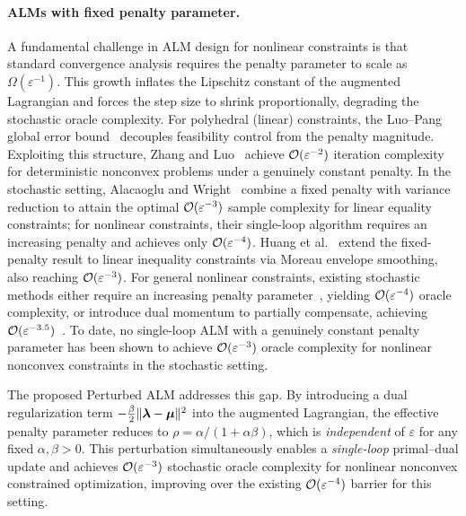 \documentclass[10pt]{article}
\begin{document}
\paragraph{ALMs with fixed penalty parameter.}
A fundamental challenge in ALM design for nonlinear constraints is that
standard convergence analysis requires the penalty parameter to scale as
$\Omega(\varepsilon^{-1})$.
This growth inflates the Lipschitz constant of the augmented Lagrangian and
forces the step size to shrink proportionally, degrading the stochastic oracle
complexity.
For polyhedral (linear) constraints, the Luo--Pang global error
bound~\cite{luo1994error} decouples feasibility control from the penalty
magnitude.
Exploiting this structure, Zhang and Luo~\cite{zhang2022proximal} achieve
$\mathcal{O}(\varepsilon^{-2})$ iteration complexity for deterministic nonconvex
problems under a genuinely constant penalty.
In the stochastic setting, Alacaoglu and
Wright~\cite{alacaoglu2024complexity} combine a fixed penalty with variance
reduction to attain the optimal $\mathcal{O}(\varepsilon^{-3})$ sample complexity for
linear equality constraints; for nonlinear constraints, their single-loop
algorithm requires an increasing penalty and achieves only $\mathcal{O}(\varepsilon^{-4})$.
Huang et al.~\cite{huang2025stochastic} extend the fixed-penalty result to
linear inequality constraints via Moreau envelope smoothing, also reaching
$\mathcal{O}(\varepsilon^{-3})$.
For general nonlinear constraints, existing stochastic methods either require
an increasing penalty parameter~\cite{li2024stochastic,alacaoglu2024complexity},
yielding $\mathcal{O}(\varepsilon^{-4})$ oracle complexity, or introduce dual
momentum to partially compensate, achieving
$\mathcal{O}(\varepsilon^{-3.5})$~\cite{shi2025momentum}.
To date, no single-loop ALM with a genuinely constant penalty parameter has
been shown to achieve $\mathcal{O}(\varepsilon^{-3})$ oracle complexity for nonlinear
nonconvex constraints in the stochastic setting.

The proposed Perturbed ALM addresses this gap.
By introducing a dual regularization term
$-\tfrac{\beta}{2}\|\bm{\lambda} - \bm{\mu}\|^2$ into the augmented Lagrangian, the
effective penalty parameter reduces to
$\rho = \alpha / (1 + \alpha\beta)$,
which is \emph{independent} of $\varepsilon$ for any fixed $\alpha, \beta > 0$.
This perturbation simultaneously enables a \emph{single-loop} primal--dual
update and achieves $\mathcal{O}(\varepsilon^{-3})$ stochastic oracle complexity for
nonlinear nonconvex constrained optimization,
improving over the existing $\mathcal{O}(\varepsilon^{-4})$ barrier for this setting.
\end{document}

